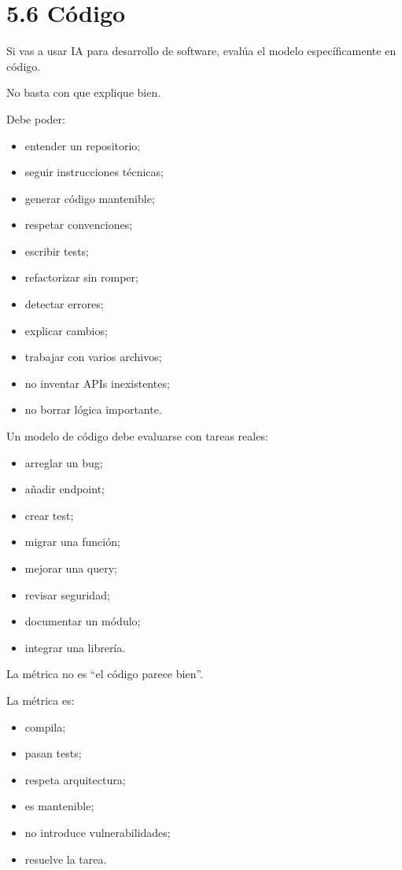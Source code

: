 \section{5.6 Código}\label{cuxf3digo}

Si vas a usar IA para desarrollo de software, evalúa el modelo
específicamente en código.

No basta con que explique bien.

Debe poder:

\begin{itemize}
\tightlist
\item
  entender un repositorio;
\item
  seguir instrucciones técnicas;
\item
  generar código mantenible;
\item
  respetar convenciones;
\item
  escribir tests;
\item
  refactorizar sin romper;
\item
  detectar errores;
\item
  explicar cambios;
\item
  trabajar con varios archivos;
\item
  no inventar APIs inexistentes;
\item
  no borrar lógica importante.
\end{itemize}

Un modelo de código debe evaluarse con tareas reales:

\begin{itemize}
\tightlist
\item
  arreglar un bug;
\item
  añadir endpoint;
\item
  crear test;
\item
  migrar una función;
\item
  mejorar una query;
\item
  revisar seguridad;
\item
  documentar un módulo;
\item
  integrar una librería.
\end{itemize}

La métrica no es ``el código parece bien''.

La métrica es:

\begin{itemize}
\tightlist
\item
  compila;
\item
  pasan tests;
\item
  respeta arquitectura;
\item
  es mantenible;
\item
  no introduce vulnerabilidades;
\item
  resuelve la tarea.
\end{itemize}

